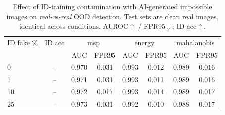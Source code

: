 \begin{table}[t]\centering
\caption{Effect of ID-training contamination with AI-generated impossible images on \emph{real-vs-real} OOD detection. Test sets are clean real images, identical across conditions. AUROC$\uparrow$ / FPR95$\downarrow$; ID acc$\uparrow$.}
\label{tab:contamination}
\begin{tabular}{lccccccc}
\toprule
ID fake \% & ID acc & \multicolumn{2}{c}{msp} & \multicolumn{2}{c}{energy} & \multicolumn{2}{c}{mahalanobis} \\
 &  & AUC & FPR95 & AUC & FPR95 & AUC & FPR95 \\ \midrule
0 & -- & 0.970 & 0.031 & 0.993 & 0.012 & 0.989 & 0.016 \\
1 & -- & 0.971 & 0.031 & 0.993 & 0.011 & 0.989 & 0.016 \\
10 & -- & 0.972 & 0.017 & 0.993 & 0.014 & 0.989 & 0.017 \\
25 & -- & 0.973 & 0.031 & 0.992 & 0.010 & 0.988 & 0.017 \\
\bottomrule
\end{tabular}
\end{table}